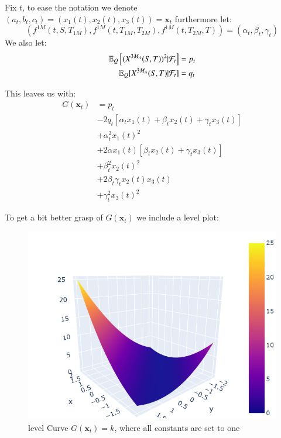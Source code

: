 Fix $t$, to ease the notation we denote $(a_{t}, b_{t}, c_{t}) = (x_{1}(t), x_{2}(t), x_{3}(t)) = \mathbf{x}_{t}$ furthermore let: 
\[
\left(
f^{1M}(t,S,T_{1M}),f^{1M}(t,T_{1M}, T_{2M}), f^{1M}(t,T_{2M}, T) 
\right)
= \left(
\alpha_{t}, \beta_{t}, \gamma_{t}
\right)
\]
We also let: 
\begin{align*}
\mathbb{E}_{Q}\left[(X^{3M_{A}}(S,T))^{2}|\mathcal{F}_{t} \right] &= p_{t} \\ 
\mathbb{E}_{Q}[X^{3M_{A}}(S,T)|\mathcal{F}_{t}] &= q_{t}
\end{align*}

This leaves us with: 
\begin{align*}
G(\mathbf{x}_{t}) &= 
p_{t} \\
&- 2q_{t}\left[
\alpha_{t} x_{1}(t) + \beta_{t} x_{2}(t) + \gamma_{t} x_{3}(t)
\right] \\ 
&+ \alpha_{t}^{2}x_{1}(t)^{2} \\ 
&+ 2\alpha x_{1}(t)\left[
\beta_{t} x_{2}(t) + \gamma_{t} x_{3}(t)
\right] \\ 
&+ \beta_{t}^{2}x_{2}(t)^{2} \\ 
&+ 2\beta_{t}\gamma_{t} x_{2}(t)x_{3}(t) \\ 
&+ \gamma_{t}^{2}x_{3}(t)^{2}
\end{align*}


\newpage 
To get a bit better grasp of $G(\mathbf{x}_{t})$ we include a level plot:

\begin{figure}[htp]
    \centering
    \includegraphics[width=12cm]{figures/SOFR/plot_G(x)_special_case.PNG}
    \caption{level Curve $G(\mathbf{x}_{t}) = k$, where all constants are set to one}
    \label{fig: plot_G(x)_SOFR_1M}
\end{figure}

